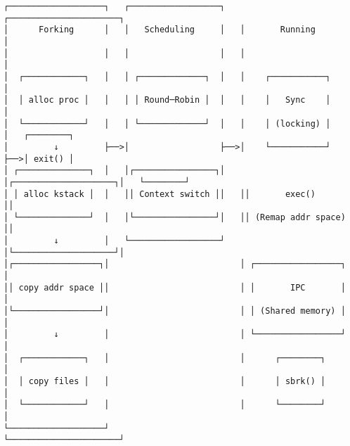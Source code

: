 \documentclass[varwidth=55em,crop]{standalone}
\begin{document}
\begin{verbatim}
┌───────────────────┐   ┌──────────────────┐   ┌──────────────────────┐
│      Forking      │   │   Scheduling     │   │       Running        │
│                   │   │                  │   │                      │
│  ┌────────────┐   │   │ ┌─────────────┐  │   │    ┌───────────┐     │
│  │ alloc proc │   │   │ │ Round─Robin │  │   │    │   Sync    │     │
│  └────────────┘   │   │ └─────────────┘  │   │    │ (locking) │     │   ┌────────┐
│         ↓         ├──>│                  ├──>│    └───────────┘     ├──>│ exit() │
│ ┌──────────────┐  │   │┌────────────────┐│   │┌────────────────────┐│   └────────┘
│ │ alloc kstack │  │   ││ Context switch ││   ││       exec()       ││
│ └──────────────┘  │   │└────────────────┘│   ││ (Remap addr space) ││
│         ↓         │   └──────────────────┘   │└────────────────────┘│
│┌─────────────────┐│                          │ ┌─────────────────┐  │
││ copy addr space ││                          │ │       IPC       │  │
│└─────────────────┘│                          │ │ (Shared memory) │  │
│         ↓         │                          │ └─────────────────┘  │
│  ┌────────────┐   │                          │      ┌────────┐      │
│  │ copy files │   │                          │      │ sbrk() │      │
│  └────────────┘   │                          │      └────────┘      │
└───────────────────┘                          └──────────────────────┘
\end{verbatim}
\end{document}
